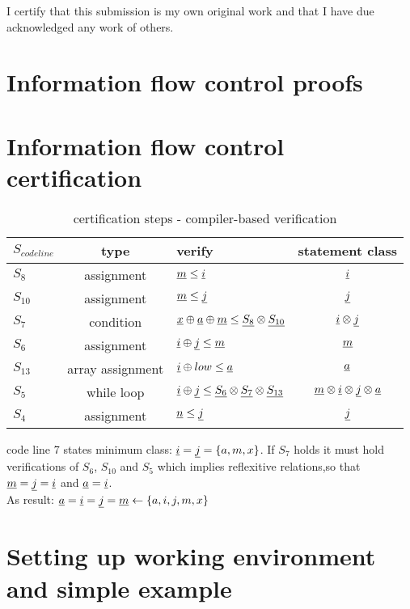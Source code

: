 





\newcommand{\nr}{08}


I certify that this submission is my own original work and that I have due
acknowledged any work of others.

\section{Information flow control proofs}

\section{Information flow control certification}

\begin{table}[h]
\caption{certification steps - compiler-based verification}
\begin{center}
    \begin{tabular}{l|c|l|c}
        $S_{codeline}$ & type & verify & statement class \\ \hline
        $S_8 $     & assignment & $\underline{m} \le \underline{i} $ & $\underline{i}$\\
        $S_{10}$   & assignment & $\underline{m} \le \underline{j} $ & $\underline{j}$ \\
        $S_7$      & condition  & $\underline{x} \oplus \underline{a} \oplus
        \underline{m} \le \underline{S_8} \otimes \underline{S_{10}}$ & $\underline{i} \otimes
        \underline{j} $ \\
        $S_6$      & assignment & $\underline{i} \oplus \underline{j} \le \underline{m}$
        & $\underline{m}$ \\
        $S_{13}$   & array assignment & $\underline{i} \oplus low \le \underline{a}$ &
        $ \underline{a} $ \\
        $S_5$      & while loop & $\underline{i} \oplus \underline{j} \le \underline{S_6}
        \otimes \underline{S_7} \otimes \underline{S_{13}} $ & $\underline{m} \otimes
        \underline{i} \otimes \underline{j} \otimes \underline{a}$ \\
        $S_4$      & assignment & $\underline{n} \le \underline{j}$ & $\underline{j}$
    \end{tabular}
\end{center}
\end{table}

code line 7 states minimum class: $\underline{i} = \underline{j} = \{a,m,x\}$.
If $S_7$ holds it must hold verifications of $S_{6}$, $S_{10}$ and $S_5$ which implies
reflexitive relations,so that $\underline{m} = \underline{j} = \underline{i}$ and $\underline{a} =
\underline{i}$.
\\
As result: $\underline{a} = \underline{i} = \underline{j} = \underline{m} \gets \{a,i,j,m,x\}$



\section{Setting up working environment and simple example}





